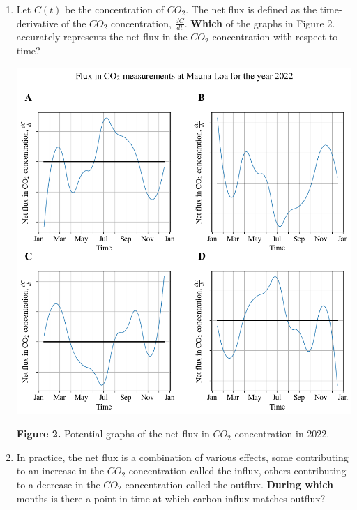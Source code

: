 \documentclass{exam}
\begin{document}
\begin{enumerate}
    \item
        Let $C(t)$ be the concentration of $CO_2$. The net flux is defined as the time-derivative of the $CO_2$ concentration, $\frac{dC}{dt}$. \textbf{Which} of the graphs in Figure 2. accurately represents the net flux in the $CO_2$ concentration with respect to time?

    \begin{center}
        \includegraphics[scale=0.6]{fluxco2measurementamaunaloa.png}
        
        \textbf{Figure 2.} Potential graphs of the net flux in $CO_2$ concentration in 2022.
    \end{center}



    \item In practice, the net flux is a combination of various effects, some contributing to an increase in the $CO_2$ concentration called the influx, others contributing to a decrease in the $CO_2$ concentration called the outflux. \textbf{During which} months is there a point in time at which carbon influx matches outflux? 


\end{enumerate}
\end{document}
